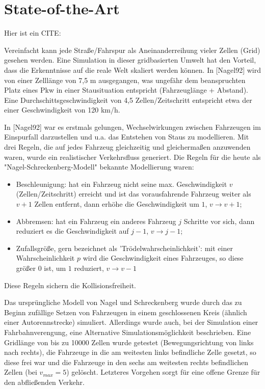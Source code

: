 \section{State-of-the-Art}
\label{sec:sota}


Hier ist ein CITE: \cite{nagel92} 



Vereinfacht kann jede Straße/Fahrspur als Aneinanderreihung vieler Zellen (Grid) gesehen werden. Eine Simulation in dieser gridbasierten Umwelt hat den Vorteil, dass die Erkenntnisse auf die reale Welt skaliert werden können. In [Nagel92] wird von einer Zelllänge von 7,5 m ausgegangen, was ungefähr dem beanspruchten Platz eines Pkw in einer Stausituation entspricht (Fahrzeuglänge + Abstand). Eine Durchschittsgeschwindigkeit von 4,5 Zellen/Zeitschritt entspricht etwa der einer Geschwindigkeit von 120 km/h.

In [Nagel92] war es erstmals gelungen, Wechselwirkungen zwischen Fahrzeugen im Einspurfall darzustellen und u.a. das Entstehen von Staus zu modellieren. Mit drei Regeln, die auf jedes Fahrzeug gleichzeitig und gleichermaßen anzuwenden waren, wurde ein realistischer Verkehrsfluss generiert. Die Regeln für die heute als "Nagel-Schreckenberg-Modell" bekannte Modellierung waren: 

\begin{itemize}
\item Beschleunigung: hat ein Fahrzeug nicht seine max. Geschwindigkeit $v$ (Zellen/Zeitschritt) erreicht und ist das vorausfahrende Fahrzeug weiter als $v+1$ Zellen entfernt, dann erhöhe die Geschwindigkeit um $1$, $v \rightarrow v+1$;
\item Abbremsen: hat ein Fahrzeug ein anderes Fahrzeug $j$ Schritte vor sich, dann reduziert es die Geschwindigkeit auf $j-1$, $v \rightarrow j-1$;
\item Zufallsgröße, gern bezeichnet als 'Trödelwahrscheinlichkeit': mit einer Wahrscheinlichkeit $p$ wird die Geschwindigkeit eines Fahrzeuges, so diese größer $0$ ist, um $1$ reduziert, $v \rightarrow v-1$
\end{itemize}

Diese Regeln sichern die Kollisionsfreiheit.

Das ursprüngliche Modell von Nagel und Schreckenberg wurde durch das zu Beginn zufällige Setzen von Fahrzeugen in einem geschlossenen Kreis (ähnlich einer Autorennstrecke) simuliert. Allerdings wurde auch, bei der Simulation einer Fahrbahnverengung, eine Alternative Simulationsmöglichkeit beschrieben. Eine Gridlänge von bis zu 10000 Zellen wurde getestet (Bewegungsrichtung von links nach rechts), die Fahrzeuge in die am weitesten links befindliche Zelle gesetzt, so diese frei war und die Fahrzeuge in den sechs am weitesten rechts befindlichen Zellen (bei $v_{max}=5$) gelöscht. Letzteres Vorgehen sorgt für eine offene Grenze für den abfließenden Verkehr.


